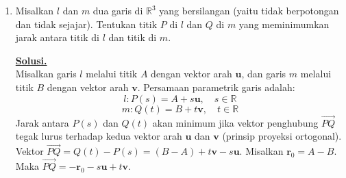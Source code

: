\documentclass[12pt,twoside]{article}
\newenvironment{solution}
{
	\par\noindent\textbf{\underline{Solusi.}}\\
}
{
	\par
}
\begin{document}
\begin{enumerate}
\begin{solution}
          \textbf{Kasus $\alpha > 1$:}
          Fungsi $f(x) = \frac{1}{x^\alpha}$ adalah fungsi turun untuk $x > 0$.
          Kita punya
          \[ \frac{a_n}{s_n^\alpha} = \frac{s_n - s_{n-1}}{s_n^\alpha}. \]
          Tinjau integral tentu dari fungsi turun $\frac{1}{t^\alpha}$ pada interval $[s_{n-1}, s_n]$.
          \[ \int_{s_{n-1}}^{s_n} \frac{1}{t^\alpha} \, dt \ge (s_n - s_{n-1}) \frac{1}{s_n^\alpha} = \frac{a_n}{s_n^\alpha}. \]
          (Luas di bawah kurva $\ge$ luas persegi panjang dengan tinggi minimum $1/s_n^\alpha$).
          Maka
          \[ \sum_{n=2}^N \frac{a_n}{s_n^\alpha} \le \sum_{n=2}^N \int_{s_{n-1}}^{s_n} t^{-\alpha} \, dt = \int_{s_1}^{s_N} t^{-\alpha} \, dt. \]
          Hitung integralnya:
          \[ \left[ \frac{t^{1-\alpha}}{1-\alpha} \right]_{s_1}^{s_N} = \frac{1}{\alpha-1} \left( \frac{1}{s_1^{\alpha-1}} - \frac{1}{s_N^{\alpha-1}} \right). \]
          Karena $\alpha > 1$ dan $s_N \to \infty$, maka limit $N \to \infty$ ada dan terbatas (konvergen).

          \textbf{Kasus $\alpha \le 1$:}
          Cukup tunjukkan divergen untuk $\alpha = 1$, karena $\frac{a_n}{s_n^\alpha} \ge \frac{a_n}{s_n}$ untuk $\alpha \le 1$ ($s_n$ besar).
          Ambil sebarang $M \in \mathbb{N}$. Karena $s_n \to \infty$, terdapat $N > M$ sehingga $s_N > 2s_M$.
          Estimasi jumlah parsial dari $M+1$ ke $N$:
          \[ \sum_{k=M+1}^N \frac{a_k}{s_k} \ge \sum_{k=M+1}^N \frac{a_k}{s_N} = \frac{1}{s_N} (s_N - s_M) = 1 - \frac{s_M}{s_N} > 1 - \frac{1}{2} = \frac{1}{2}. \]
          Ini melanggar Kriteria Cauchy untuk konvergensi deret (ekor deret tidak menuju nol).
          Jadi deret divergen untuk $\alpha \le 1$.

          Kesimpulannya, deret konvergen jika dan hanya jika $\alpha > 1$.
        \end{solution}

  \item Misalkan $l$ dan $m$ dua garis di $\mathbb{R}^3$ yang bersilangan (yaitu tidak berpotongan dan tidak sejajar). Tentukan titik $P$ di $l$ dan $Q$ di $m$ yang meminimumkan jarak antara titik di $l$ dan titik di $m$.
        \begin{solution}
          Misalkan garis $l$ melalui titik $A$ dengan vektor arah $\mathbf{u}$, dan garis $m$ melalui titik $B$ dengan vektor arah $\mathbf{v}$.
          Persamaan parametrik garis adalah:
          \[ l: P(s) = A + s\mathbf{u}, \quad s \in \mathbb{R} \]
          \[ m: Q(t) = B + t\mathbf{v}, \quad t \in \mathbb{R} \]
          Jarak antara $P(s)$ dan $Q(t)$ akan minimum jika vektor penghubung $\vec{PQ}$ tegak lurus terhadap kedua vektor arah $\mathbf{u}$ dan $\mathbf{v}$ (prinsip proyeksi ortogonal).
          Vektor $\vec{PQ} = Q(t) - P(s) = (B - A) + t\mathbf{v} - s\mathbf{u}$.
          Misalkan $\mathbf{r}_0 = A - B$. Maka $\vec{PQ} = -\mathbf{r}_0 - s\mathbf{u} + t\mathbf{v}$.


\end{solution}
\end{enumerate}
\end{document}
